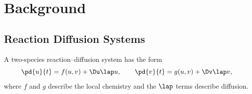 \section{Background}
\label{sec:background}

%

\subsection{Reaction Diffusion Systems}
\label{sec:rd-systems}


A two-species reaction--diffusion system has the form
\begin{equation}
	\label{eq:rd-general}
	\pd{u}{t} = f(u, v) + \Du \lap u, \qquad
	\pd{v}{t} = g(u, v) + \Dv \lap v,
\end{equation}
where $f$ and $g$ describe the local chemistry and the $\lap$ terms describe diffusion.
